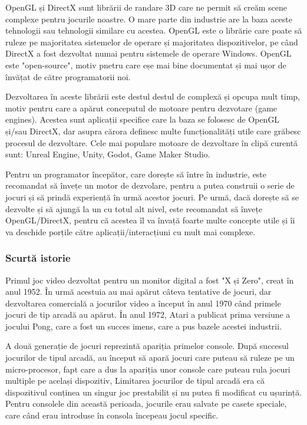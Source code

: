 \documentclass[12pt, a4paper]{article}
\begin{document}
	OpenGL și DirectX sunt librării de randare 3D care ne permit să creăm scene complexe pentru jocurile noastre. O mare parte din industrie are la baza aceste tehnologii sau tehnologii similare cu acestea. OpenGL este o librărie care poate să ruleze pe majoritatea sistemelor de operare și majoritatea dispozitivelor, pe când DirectX a fost dezvoltat numai pentru sistemele de operare Windows. OpenGL este "open-source", motiv pnetru care eșe mai bine documentat și mai ușor de învățat de către programatorii noi.
	\newline
	
	Dezvoltarea în aceste librării este destul destul de complexă și opcupa mult timp, motiv pentru care a apărut conceputul de motoare pentru dezvotare (game engines). Acestea sunt aplicații specifice care la baza se folosesc de OpenGL și/sau DirectX, dar asupra cărora definesc multe funcționalități utile care grăbesc procesul de dezvoltare. Cele mai populare motoare de dezvoltare în clipă curentă sunt: Unreal Engine, Unity, Godot, Game Maker Studio.
	\newline
	
	Pentru un programator începător, care dorește să între în industrie, este recomandat să învețe un motor de dezvolare, pentru a putea construii o serie de jocuri și să prindă experiență în urmă acestor jocuri. Pe urmă, dacă dorește să se dezvolte și să ajungă la un cu totul alt nivel, este recomandat să învețe OpenGL/DirectX, pentru că acestea îl va învață foarte multe concepte utile și îi va deschide porțile către aplicații/interacțiuni cu mult mai complexe.
	
	
	
	
	\subsubsection{Scurtă istorie}
	
	Primul joc video dezvoltat pentru un monitor digital a fost "X și Zero", creat în anul 1952. În urmă acestuia au mai apărut câteva tentative de jocuri, dar dezvoltarea comercială a jocurilor video a început în anul 1970 când primele jocuri de tip arcadă au apărut. În anul 1972, Atari a publicat prima versiune a jocului Pong, care a fost un succes imens, care a pus bazele acestei industrii.
	\newline
	
	A două generație de jocuri reprezintă apariția primelor console. După succesul jocurilor de tipul arcadă, au început să apară jocuri care puteau să ruleze pe un micro-procesor, fapt care a dus la apariția unor console care puteau rula jocuri multiple pe același dispozitiv, Limitarea jocurilor de tipul arcadă era că dispozitivul conținea un singur joc prestabilit și nu putea fi modificat cu ușurință. Pentru consolele din această perioada, jocurile erau salvate pe casete speciale, care când erau introduse în consola începeau jocul specific.
	\newline
	
\end{document}
